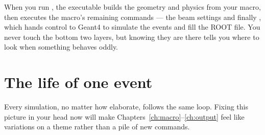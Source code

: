 \begin{center}
\end{center}

When you run , the executable builds the geometry and physics from your macro, then executes the macro's remaining commands --- the beam settings and finally , which hands control to Geant4 to simulate the events and fill the ROOT file. You never touch the bottom two layers, but knowing they are there tells you where to look when something behaves oddly.

\section{The life of one event}
Every simulation, no matter how elaborate, follows the same loop. Fixing this picture in your head now will make Chapters~\ref{ch:macro}--\ref{ch:output} feel like variations on a theme rather than a pile of new commands.

